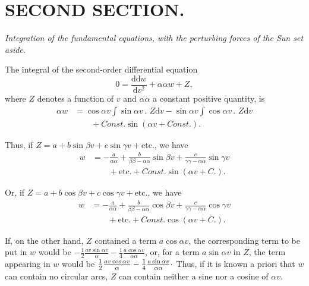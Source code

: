 \clearpage
\begingroup
{}
\renewcommand{\headrulewidth}{0pt}
\section*{SECOND SECTION.}
\begin{center}
\itshape Integration of the fundamental equations, with the perturbing
forces of the Sun set aside.
\end{center}

\par\noindent\hspace*{\parindent}

\par\noindent\hspace*{\parindent}The integral of the second-order differential equation
\[
0=\frac{\mathrm{dd}w}{\mathrm{d}v^2}+\alpha\alpha w+Z,
\]
\noindent where \(Z\) denotes a function of \(v\) and \(\alpha\alpha\) a constant
positive quantity, is
\[
\begin{aligned}
\alpha w&=\cos\alpha v\int\sin\alpha v\mathpunct{.}\,Z\mathrm{d}v
 -\sin\alpha v\int\cos\alpha v\mathpunct{.}\,Z\mathrm{d}v\\
 &\qquad+\mathit{Const.}\sin(\alpha v+\mathit{Const.}).
\end{aligned}
\]

\par\noindent\hspace*{\parindent}Thus, if \(Z=a+b\sin\beta v+c\sin\gamma v+\mathrm{etc.}\), we have
\[
\begin{aligned}
w&=-\frac{a}{\alpha\alpha}+\frac{b}{\beta\beta-\alpha\alpha}\sin\beta v
 +\frac{c}{\gamma\gamma-\alpha\alpha}\sin\gamma v\\
 &\qquad+\mathrm{etc.}+\mathit{Const.}\sin(\alpha v+C.).
\end{aligned}
\]

\par\noindent Or, if \(Z=a+b\cos\beta v+c\cos\gamma v+\mathrm{etc.}\), we have
\[
\begin{aligned}
w&=-\frac{a}{\alpha\alpha}+\frac{b}{\beta\beta-\alpha\alpha}\cos\beta v
 +\frac{c}{\gamma\gamma-\alpha\alpha}\cos\gamma v\\
 &\qquad+\mathrm{etc.}+\mathit{Const.}\cos(\alpha v+C.).
\end{aligned}
\]

\par\noindent\hspace*{\parindent}If, on the other hand, \(Z\) contained a term \(a\cos\alpha v\), the corresponding term to be put in
\(w\) would be \(-\tfrac12\frac{av\sin\alpha v}{\alpha}
-\tfrac14\frac{a\cos\alpha v}{\alpha\alpha}\), or, for a term
\(a\sin\alpha v\) in \(Z\), the term appearing in \(w\) would be
\(\tfrac12\frac{av\cos\alpha v}{\alpha}
-\tfrac14\frac{a\sin\alpha v}{\alpha\alpha}\mathpunct{\raisebox{.4ex}{.}}\)
Thus, if it is known a priori that \(w\) can contain no circular arcs,
\(Z\) can contain neither a sine nor a cosine of \(\alpha v\).

